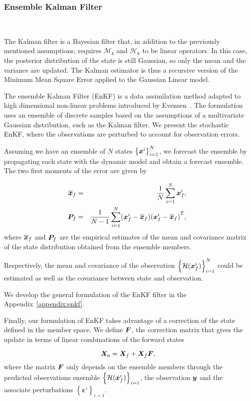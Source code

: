 \subsubsection{Ensemble Kalman Filter}~{\label{enkf}}


The Kalman filter \cite{kalman_new_1960} is a Bayesian filter that, in addition to the previously mentioned assumptions, requires $\mathcal{M}_k$ and $\mathcal{H}_k$ to be linear operators. In this case, the posterior distribution of the state is still Gaussian, so only the mean and the variance are updated. The Kalman estimator is thus a recursive version of the Minimum Mean Square Error applied to the Gaussian Linear model.

The ensemble Kalman Filter (EnKF) is a data assimilation method adapted to high dimensional non-linear problems introduced by Evensen~\cite{evensen_sequential_1994}. The formulation uses an ensemble of discrete samples based on the assumptions of a multivariate Gaussian distribution, such as the Kalman filter. We present the stochastic EnKF, where the observations are perturbed to account for observation errors.

Assuming we have an ensemble of $N$ states $\left\{\bm {\bm{x}}^i \right\}_{i=1}^N$, we forecast the ensemble by propagating each state with the dynamic model and obtain a forecast ensemble.
The two first moments of the error are given by

\begin{eqnarray*}
    \overline{\bm{x}}_f &=& \frac{1}{N} \sum_{i = 1}^{N} \bm{x}^i_f, \\
    \bm{P}_f &=& \frac{1}{N-1} \sum_{i = 1}^{N} (\bm{x}^i_f - \overline{\bm{x}}_f){(\bm{x}^i_f - \overline{\bm{x}}_f)}^T,
\end{eqnarray*}
where $\overline{\bm{x}}_f$ and $\bm{P}_f$ are the empirical estimates of the mean and covariance matrix of the state distribution obtained from the ensemble members.

Respectively, the mean and covariance of the observation $\left\{\mathcal{H}(\bm{x}^i_f) \right\}_{i=1}^N$ could be estimated as well as the covariance between state and observation.

We develop the general formulation of the EnKF filter in the Appendix~\ref{appendix:enkf}.

Finally, our formulation of EnKF takes advantage of a correction of the state defined in the member space. We define $\bm{F}$, the correction matrix that gives the update in terms of linear combinations of the forward states

\begin{equation}~\label{enkf_formula_Fcorr}
    \bm{X}_a = \bm{X}_f + \bm{X}_f \bm{F},
\end{equation}where the matrix $\bm{F}$ only depends on the ensemble members through the predicted observations ensemble $\left\{\mathcal{H}(\bm{x}^i_f) \right\}_{i=1}$, the observation $\bm{y}$ and the associate perturbations  $\left\{\bm{\varepsilon}^i \right\}_{i=1}$.